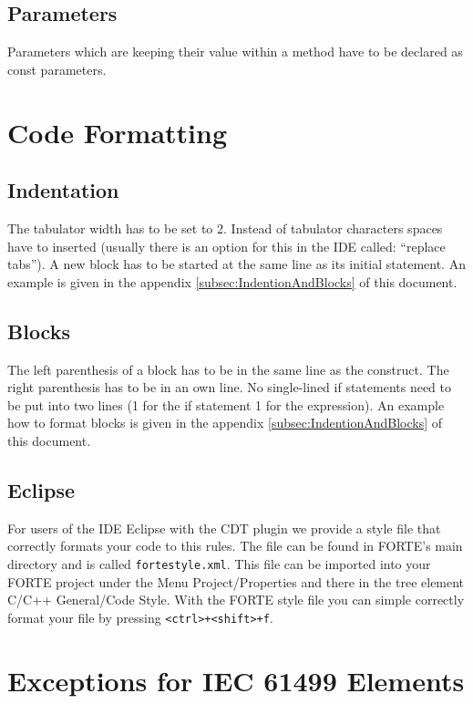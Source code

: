 \documentclass[final,a4paper,10pt, oneside]{article}
\begin{document}
\subsection{Parameters}
Parameters which are keeping their value within a method have to be declared as const parameters.

\section{Code Formatting}
\subsection{Indentation}
The tabulator width has to be set to 2. Instead of tabulator characters spaces have to inserted (usually there is an option for this in the IDE called: ``replace tabs'').
A new block has to be started at the same line as its initial statement.
An example is given in the appendix \ref{subsec:IndentionAndBlocks} of this document.

\subsection{Blocks}
The left parenthesis of a block has to be in the same line as the construct. The right parenthesis has to be in an own line. No single-lined if statements need to be put into two lines (1 for the if statement 1 for the expression). An example how to format blocks is given in the appendix \ref{subsec:IndentionAndBlocks} of this document.

\subsection{Eclipse}
For users of the IDE Eclipse with the CDT plugin we provide a style file that correctly formats your code to this rules. The file can be found in FORTE's main directory and is called \verb=fortestyle.xml=. This file can be imported into your FORTE project under the Menu Project/Properties and there in the tree element C/C++ General/Code Style. With the FORTE style file you can simple correctly format your file by pressing \verb=<ctrl>+<shift>+f=.

\section{Exceptions for IEC 61499 Elements}
\end{document}
